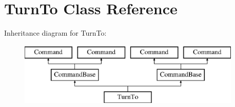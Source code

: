 \hypertarget{class_turn_to}{}\section{Turn\+To Class Reference}
\label{class_turn_to}
Inheritance diagram for Turn\+To\+:\begin{figure}[H]
\begin{center}
\leavevmode
\includegraphics[height=3.000000cm]{class_turn_to}
\end{center}
\end{figure}
